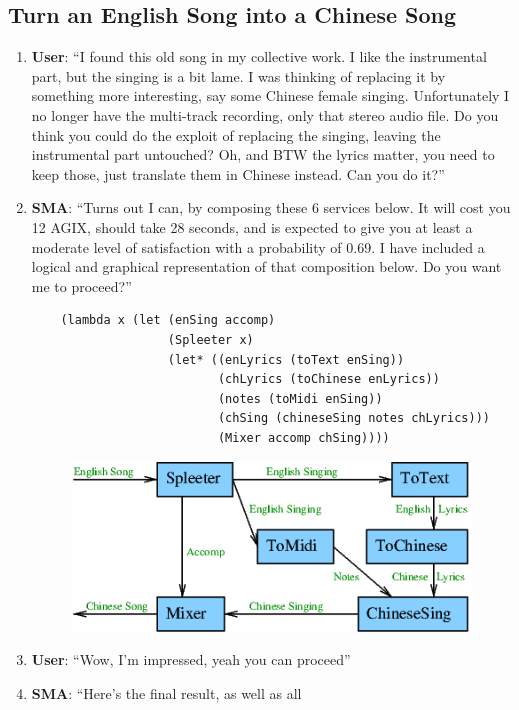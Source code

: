\documentclass[]{article}
\begin{document}
\subsection{Turn an English Song into a Chinese Song}
\begin{enumerate}
\item \textbf{User}: ``I found this old song in my collective work.  I
  like the instrumental part, but the singing is a bit lame.  I was
  thinking of replacing it by something more interesting, say some
  Chinese female singing.  Unfortunately I no longer have the
  multi-track recording, only that stereo audio file.  Do you think
  you could do the exploit of replacing the singing, leaving the
  instrumental part untouched?  Oh, and BTW the lyrics matter, you
  need to keep those, just translate them in Chinese instead.  Can you
  do it?''
\item \textbf{SMA}: ``Turns out I can, by composing these 6 services
  below.  It will cost you 12 AGIX, should take 28 seconds, and is
  expected to give you at least a moderate level of satisfaction with
  a probability of 0.69.  I have included a logical and graphical
  representation of that composition below.  Do you want me to
  proceed?''
  \begin{verbatim}
    (lambda x (let (enSing accomp)
                   (Spleeter x)
                   (let* ((enLyrics (toText enSing))
                          (chLyrics (toChinese enLyrics))
                          (notes (toMidi enSing))
                          (chSing (chineseSing notes chLyrics)))
                          (Mixer accomp chSing))))
  \end{verbatim}
  \begin{figure}[H]
    \centering
    \includegraphics[scale=0.55]{figs/EnglishToChineseSong.png}
  \end{figure}
\item \textbf{User}: ``Wow, I'm impressed, yeah you can proceed''
\item \textbf{SMA}: ``Here's the final result, as well as all

\end{enumerate}
\end{document}
